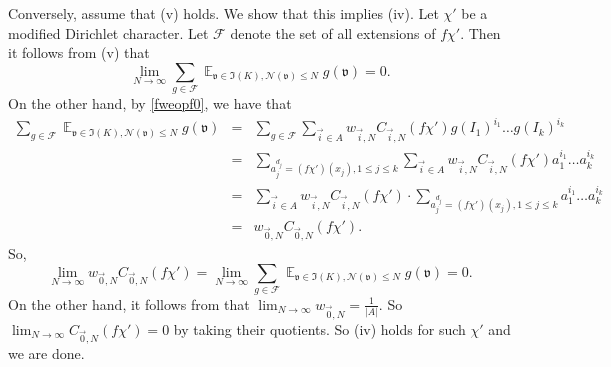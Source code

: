 \documentclass[11pt]{amsart}
\theoremstyle{definition}
\DeclareMathOperator*{\E}{\mathbb{E}}
\newcommand{\NN}{{\mathcal N}}
\newcommand{\FM}[1]{{\color{violet}{{#1}}}}
\begin{document}
Conversely, assume that (v) holds. We show that this implies (iv). Let $\chi'$ be a modified Dirichlet character. %
Let $\mathcal{F}$ denote the set of all extensions of $f\chi'$.
Then it follows from (v) that $$\lim_{N\to\infty} \sum_{g\in\mathcal{F}}\E_{\mathfrak{v}\in \mathfrak{I}(K), \NN(\mathfrak{v})\leq N}g(\mathfrak{v})=0.$$
On the other hand, by \eqref{fweopf0}, we have that 
   \begin{eqnarray*}
 \sum_{g\in\mathcal{F}}\E_{\mathfrak{v}\in \mathfrak{I}(K), \NN(\mathfrak{v})\leq N}g(\mathfrak{v}) 
    & = & \sum_{g\in\mathcal{F}}\sum_{\vec{i}\in A}w_{\vec{i},N}C_{\vec{i},N}(f\chi')g(I_{1})^{i_{1}}\dots g(I_{k})^{i_{k}}
        \\& = &\sum_{a_{j}^{d_{j}}=(f\chi')(x_{j}), 1\leq j\leq k}\sum_{\vec{i}\in A}w_{\vec{i},N}C_{\vec{i},N}(f\chi')a_{1}^{i_{1}}\dots a_{k}^{i_{k}}
        \\& = &\sum_{\vec{i}\in A}w_{\vec{i},N}C_{\vec{i},N}(f\chi')\cdot\sum_{a_{j}^{d_{j}}=(f\chi')(x_{j}), 1\leq j\leq k}a_{1}^{i_{1}}\dots a_{k}^{i_{k}}
        \\& = & w_{\vec{0},N}C_{\vec{0},N}(f\chi').
 \end{eqnarray*}
So,
$$\lim_{N\to\infty}w_{\vec{0},N}C_{\vec{0},N}(f\chi')
        =\lim_{N\to\infty} \sum_{g\in\mathcal{F}}\E_{\mathfrak{v}\in \mathfrak{I}(K), \NN(\mathfrak{v})\leq N}g(\mathfrak{v})=0.$$
        On the other hand, it follows from \cite[Theorem~11.1.5]{murtyesmondebook} that
        $\lim_{N\to\infty}w_{\vec{0},N}=\frac{1}{|A|}$. So
        $\lim_{N\to\infty}C_{\vec{0},N}(f\chi')=0$ by taking their quotients. So (iv) holds for such $\chi'$ and 
we are done. 

\end{document}
